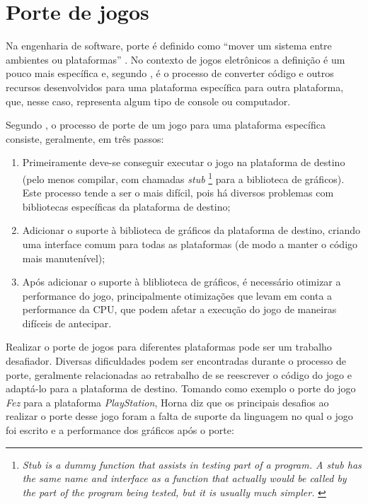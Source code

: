 \section{Porte de jogos}

Na engenharia de software, porte é definido como ``mover um sistema entre ambientes ou plataformas'' \cite{frakes}. No contexto de jogos eletrônicos a definição é um pouco mais específica e, segundo , é o processo de converter código e outros recursos desenvolvidos para uma plataforma específica para outra plataforma, que, nesse caso, representa algum tipo de console ou computador.

Segundo , o processo de porte de um jogo para uma plataforma específica consiste, geralmente, em três passos:

\begin{enumerate}
  \item Primeiramente deve-se conseguir executar o jogo na plataforma de destino (pelo menos compilar, com chamadas \textit{stub} \footnote{\textit{Stub is a dummy function that assists in testing part of a program. A stub has the same name and interface as a function that actually would be called by the part of the program being tested, but it is usually much simpler.} \cite{dale}} para a biblioteca de gráficos). Este processo tende a ser o mais difícil, pois há diversos problemas com bibliotecas específicas da plataforma de destino;
  \item Adicionar o suporte à biblioteca de gráficos da plataforma de destino, criando uma interface comum para todas as plataformas (de modo a manter o código mais manutenível);
  \item Após adicionar o suporte à bliblioteca de gráficos, é necessário otimizar a performance do jogo, principalmente otimizações que levam em conta a performance da CPU, que podem afetar a execução do jogo de maneiras difíceis de antecipar.
\end{enumerate}

Realizar o porte de jogos para diferentes plataformas pode ser um trabalho desafiador. Diversas dificuldades podem ser encontradas durante o processo de porte, geralmente relacionadas ao retrabalho de se reescrever o código do jogo e adaptá-lo para a plataforma de destino. Tomando como exemplo o porte do jogo \textit{Fez} para a plataforma \textit{PlayStation}, Horna diz que os principais desafios ao realizar o porte desse jogo foram a falta de suporte da linguagem no qual o jogo foi escrito e a performance dos gráficos após o porte:

